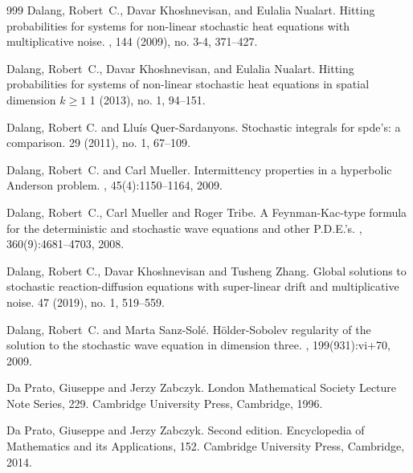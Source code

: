 \documentclass[a4paper,12pt]{article}
\theoremstyle{plain}
\theoremstyle{definition}
\begin{document}
\begin{thebibliography}{999}
Dalang, Robert~C., Davar Khoshnevisan, and Eulalia Nualart.
\newblock Hitting probabilities for systems for non-linear stochastic heat equations with multiplicative noise.
, 144 (2009), no. 3-4, 371--427.

Dalang, Robert~C., Davar Khoshnevisan, and Eulalia Nualart.
\newblock Hitting probabilities for systems of non-linear stochastic heat equations in spatial dimension $k\ge 1$
 1 (2013), no. 1, 94--151.

Dalang, Robert C. and Llu\'is Quer-Sardanyons.
\newblock Stochastic integrals for spde's: a comparison. 
 29 (2011), no. 1, 67--109. 

Dalang, Robert~C. and Carl Mueller.
\newblock Intermittency properties in a hyperbolic {A}nderson problem.
, 45(4):1150--1164, 2009.

Dalang, Robert~C., Carl Mueller and Roger Tribe.
\newblock A {F}eynman-{K}ac-type formula for the deterministic and stochastic wave equations and other {P}.{D}.{E}.'s.
, 360(9):4681--4703, 2008.

Dalang, Robert C., Davar Khoshnevisan and Tusheng Zhang.
\newblock Global solutions to stochastic reaction-diffusion equations with super-linear drift and multiplicative noise. 
 47 (2019), no. 1, 519--559.

Dalang, Robert~C. and Marta Sanz-Sol{\'e}.
\newblock H\"older-{S}obolev regularity of the solution to the stochastic wave equation in dimension three.
, 199(931):vi+70, 2009.

Da Prato, Giuseppe and Jerzy Zabczyk.
\newblock London Mathematical Society Lecture Note Series, 229. Cambridge University Press, Cambridge, 1996. 


Da Prato, Giuseppe and Jerzy Zabczyk.
 Second edition. 
\newblock Encyclopedia of Mathematics and its Applications, 152. Cambridge University Press, Cambridge, 2014. 


\end{thebibliography}
\end{document}

